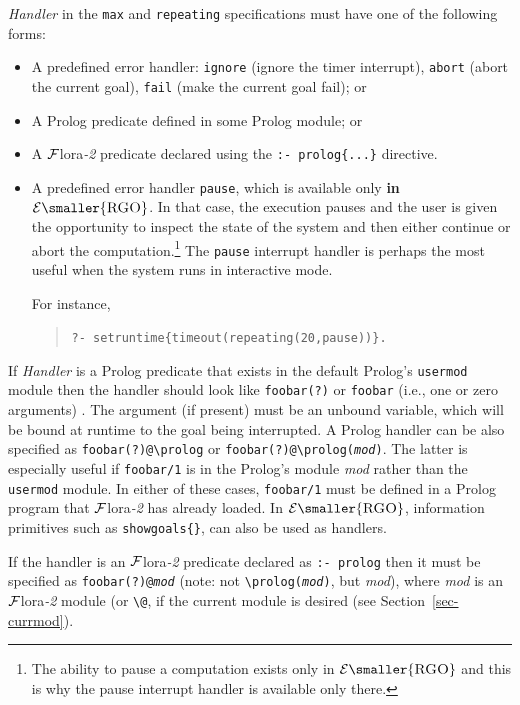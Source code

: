 \documentclass[11pt]{article}
\newcommand{\FLORA}{{\mbox{\sc ${\cal F}${lora}\rm\emph{-2}}}\xspace}
\newcommand{\ERGO}{\ensuremath{\cal{E}\mbox{\smaller{\sc{RGO}}}}\xspace}
\newcommand{\FLSYSTEM}{\FLORA}
\newcommand{\bs}{\textbackslash}
\begin{document}
\noindent
{}
\emph{Handler} in the \texttt{max} and \texttt{repeating}
specifications must have one of the following forms:
  \begin{itemize}
  \item A predefined error handler: \texttt{ignore} (ignore the timer
    interrupt), \texttt{abort} (abort the current goal), \texttt{fail}
    (make the current goal fail); or
  \item A Prolog predicate defined in some Prolog module; or
  \item A \FLSYSTEM predicate declared using the \texttt{:- prolog\{...\}} directive.
  \item A predefined error handler \texttt{pause}, which is available only
    \textbf{in} \ERGO. In that case, the execution pauses and the user is
    given the
    opportunity to inspect the state of the system and then either continue
    or abort the computation.\footnote{The ability to pause a computation exists
    only in \ERGO and this is why the pause interrupt handler is available
    only there.}
  The \texttt{pause} interrupt handler is perhaps the most useful when the
  system runs in interactive mode. 
\ifdef{\isfloraman}{}
{
  For instance,
  \begin{quote}
    \texttt{?- setruntime\{timeout(repeating(20,pause))\}.}     
  \end{quote}
  }
  \end{itemize}

  If \emph{Handler} is a Prolog predicate that exists in the default
  Prolog's \texttt{usermod} module then the handler should look like
  \texttt{foobar(?)} or \texttt{foobar} (i.e., one or zero arguments) .
  The argument (if present) must be an unbound variable, which will
  be bound at runtime to the goal being interrupted.
  A Prolog handler can be also specified as \texttt{foobar(?)@\bs{}prolog} or
  \texttt{foobar(?)@\bs{}prolog(\emph{mod})}. The latter is especially useful if
  \texttt{foobar/1} is in the Prolog's module \emph{mod} rather than
  the \texttt{usermod} module. In either of these cases, \texttt{foobar/1} 
  must be defined in a Prolog program that \FLSYSTEM has already loaded.
  In \ERGO, information primitives such as \texttt{showgoals\{\}}, can also
  be used as handlers. 

  If the handler is an \FLSYSTEM predicate declared
  as \texttt{:- prolog} then it must be specified as
  \texttt{foobar(?)@\emph{mod}} (note: not \texttt{\bs{}prolog(\emph{mod})}, but
  \emph{mod}), where \emph{mod} is an \FLSYSTEM module (or
  \texttt{\bs{}@}, if the current module is desired (see
  Section~\ref{sec-currmod}).
\end{document}
